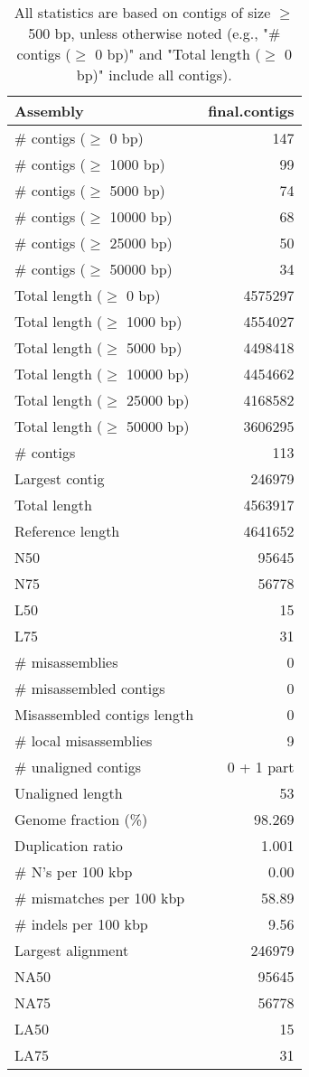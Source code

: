 \documentclass[12pt,a4paper]{article}
\begin{document}
\begin{table}[ht]
\begin{center}
\caption{All statistics are based on contigs of size $\geq$ 500 bp, unless otherwise noted (e.g., "\# contigs ($\geq$ 0 bp)" and "Total length ($\geq$ 0 bp)" include all contigs).}
\begin{tabular}{|l*{1}{|r}|}
\hline
Assembly & final.contigs \\ \hline
\# contigs ($\geq$ 0 bp) & 147 \\ \hline
\# contigs ($\geq$ 1000 bp) & 99 \\ \hline
\# contigs ($\geq$ 5000 bp) & 74 \\ \hline
\# contigs ($\geq$ 10000 bp) & 68 \\ \hline
\# contigs ($\geq$ 25000 bp) & 50 \\ \hline
\# contigs ($\geq$ 50000 bp) & 34 \\ \hline
Total length ($\geq$ 0 bp) & 4575297 \\ \hline
Total length ($\geq$ 1000 bp) & 4554027 \\ \hline
Total length ($\geq$ 5000 bp) & 4498418 \\ \hline
Total length ($\geq$ 10000 bp) & 4454662 \\ \hline
Total length ($\geq$ 25000 bp) & 4168582 \\ \hline
Total length ($\geq$ 50000 bp) & 3606295 \\ \hline
\# contigs & 113 \\ \hline
Largest contig & 246979 \\ \hline
Total length & 4563917 \\ \hline
Reference length & 4641652 \\ \hline
N50 & 95645 \\ \hline
N75 & 56778 \\ \hline
L50 & 15 \\ \hline
L75 & 31 \\ \hline
\# misassemblies & 0 \\ \hline
\# misassembled contigs & 0 \\ \hline
Misassembled contigs length & 0 \\ \hline
\# local misassemblies & 9 \\ \hline
\# unaligned contigs & 0 + 1 part \\ \hline
Unaligned length & 53 \\ \hline
Genome fraction (\%) & 98.269 \\ \hline
Duplication ratio & 1.001 \\ \hline
\# N's per 100 kbp & 0.00 \\ \hline
\# mismatches per 100 kbp & 58.89 \\ \hline
\# indels per 100 kbp & 9.56 \\ \hline
Largest alignment & 246979 \\ \hline
NA50 & 95645 \\ \hline
NA75 & 56778 \\ \hline
LA50 & 15 \\ \hline
LA75 & 31 \\ \hline
\end{tabular}
\end{center}
\end{table}
\end{document}
